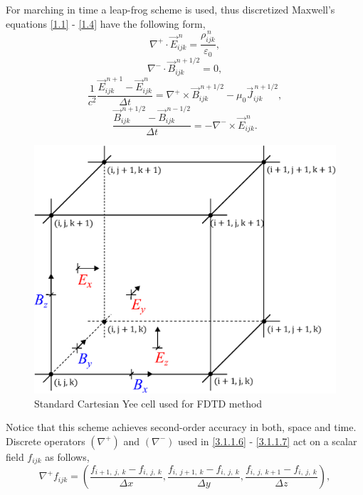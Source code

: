 For marching in time a leap-frog scheme is used, thus discretized Maxwell's equations \ref{1.1} - \ref{1.4} have the following form,
\begin{equation}
\label{3.1.1.6}
\nabla^{+} \cdot \vec{E}_{ijk}^{\,n} = \frac{\rho_{ijk}^{\,n}}{\varepsilon_0},
\end{equation}
\begin{equation}
\label{3.1.1.15}
\nabla^{-} \cdot \vec{B}_{ijk}^{\,n + 1/2} = 0,
\end{equation}
\begin{equation}
\label{3.1.1.16}
\frac{1}{c^{2}} \frac{\vec{E}_{ijk}^{\,n + 1} - \vec{E}_{ijk}^{\,n}}{\Delta t} = \nabla^{+} \times \vec{B}_{ijk}^{\,n + 1/2} - \mu_{0} \vec{J}_{ijk}^{\,n + 1/2},
\end{equation}
\begin{equation}
\label{3.1.1.7}
\frac{\vec{B}_{ijk}^{\,n + 1/2} - \vec{B}_{ijk}^{\,n - 1/2}}{\Delta t} = -\nabla^{-} \times \vec{E}_{ijk}^{\,n}.
\end{equation}
\begin{figure}[t]
	\centering
	\includegraphics[width=0.355\paperwidth]{./img/YEE/yee.eps}
	\caption{Standard Cartesian Yee cell used for FDTD method}
	\label{3.1.1.14}
\end{figure}
Notice that this scheme achieves second-order accuracy in both, space and time. Discrete operators $ \left(\nabla^{+}\right) $ and $ \left(\nabla^{-}\right) $ used in \ref{3.1.1.6} - \ref{3.1.1.7} act on a scalar field $ f_{i j k} $ as follows,
\begin{equation}
\label{3.1.1.8}
\nabla^{+} f_{i j k} = \left(\frac{f_{i + 1,\: j,\: k} - f_{i,\: j,\: k}}{\Delta x}, \frac{f_{i,\: j + 1,\: k} - f_{i,\: j,\: k}}{\Delta y}, \frac{f_{i,\: j,\: k + 1} - f_{i,\: j,\: k}}{\Delta z} \right), 
\end{equation}
